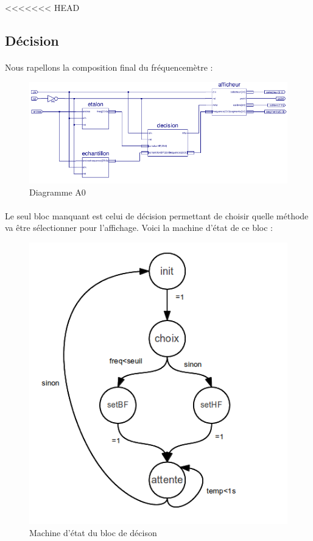\documentclass[a4paper,11pt]{article}
\begin{document}
<<<<<<< HEAD

  \subsection{Décision}
 \paragraph{} Nous rapellons la composition final du fréquencemètre :
 
 \begin{figure}[H]
\begin{center}
	\includegraphics[scale=1]{sch-frequencemetre.png}
	\caption{Diagramme A0}
\end{center}
\end{figure}

  \paragraph{}Le seul bloc manquant est celui de décision permettant de choisir quelle méthode va être 
  sélectionner pour l'affichage. Voici la machine d'état de ce bloc :
  
   \begin{figure}[H]
\begin{center}
	\includegraphics[scale=.6]{machine_decision.png}
	\caption{Machine d'état du bloc de décison}
\end{center}
\end{figure}
  
\end{document}
